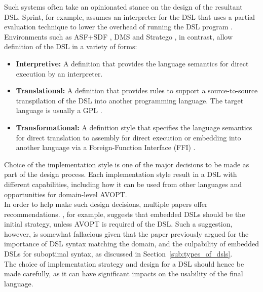 \documentclass[a4paper,11pt]{report}
\begin{document}
Such systems often take an opinionated stance on the design of the resultant DSL. 
Sprint, for example, assumes an interpreter for the DSL that uses a partial evaluation technique to lower the overhead of running the DSL program \citep{Consel98architecturingsoftware}.
Environments such as ASF+SDF \citep{van2001asf+}, DMS \citep{baxter2004dms} and Stratego \citep{visser2003stratego}, in contrast, allow definition of the DSL in a variety of forms:
\begin{itemize}
    \item \textbf{Interpretive:} A definition that provides the language semantics for direct execution by an interpreter.
    \item \textbf{Translational:} A definition that provides rules to support a source-to-source transpilation of the DSL into another programming language.
    The target language is usually a GPL \citep{Mernik:2005:DDL:1118890.1118892}.
    \item \textbf{Transformational:} A definition style that specifies the language semantics for direct translation to assembly for direct execution or embedding into another language via a Foreign-Function Interface (FFI) \citep{van2001asf+}.
\end{itemize}

Choice of the implementation style is one of the major decisions to be made as part of the design process.
Each implementation style result in a DSL with different capabilities, including how it can be used from other languages and opportunities for domain-level AVOPT. \\

In order to help make such design decisions, multiple papers offer recommendations.
\citet{Mernik:2005:DDL:1118890.1118892}, for example, suggests that embedded DSLs should be the initial strategy, unless AVOPT is required of the DSL.
Such a suggestion, however, is somewhat fallacious given that the paper previously argued for the importance of DSL syntax matching the domain, and the culpability of embedded DSLs for suboptimal syntax, as discussed in Section~\ref{sub:types_of_dsls}. \\

The choice of implementation strategy and design for a DSL should hence be made carefully, as it can have significant impacts on the usability of the final language. 


\end{document}
